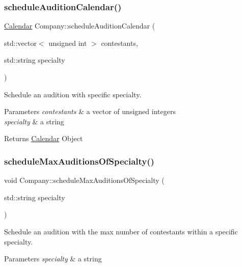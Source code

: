 \subsubsection{\texorpdfstring{schedule\+Audition\+Calendar()}{scheduleAuditionCalendar()}}
{\footnotesize\ttfamily \hyperlink{class_calendar}{Calendar} Company\+::schedule\+Audition\+Calendar (\begin{DoxyParamCaption}\item[{std\+::vector$<$ unsigned int $>$}]{contestants,  }\item[{std\+::string}]{specialty }\end{DoxyParamCaption})}



Schedule an audition with specific specialty. 


\begin{DoxyParams}{Parameters}
{\em contestants} & a vector of unsigned integers \\
\hline
{\em specialty} & a string \\
\hline
\end{DoxyParams}
\begin{DoxyReturn}{Returns}
\hyperlink{class_calendar}{Calendar} Object 
\end{DoxyReturn}
\mbox{\label{class_company_a6da20c8e4cdbaa15326fa3c44ec70885}} 
\subsubsection{\texorpdfstring{schedule\+Max\+Auditions\+Of\+Specialty()}{scheduleMaxAuditionsOfSpecialty()}}
{\footnotesize\ttfamily void Company\+::schedule\+Max\+Auditions\+Of\+Specialty (\begin{DoxyParamCaption}\item[{std\+::string}]{specialty }\end{DoxyParamCaption})}



Schedule an audition with the max number of contestants within a specific specialty. 


\begin{DoxyParams}{Parameters}
{\em specialty} & a string \\
\hline
\end{DoxyParams}
\mbox{\label{class_company_afdc3c8abaa98ce16673e307245ece7fc}} 
